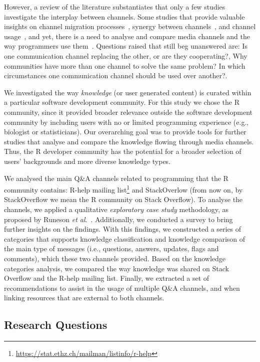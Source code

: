 \documentclass{sig-alternate-05-2015}
\begin{document}
	However, a review of the literature substantiates that only a few studies investigate the interplay between channels.
	Some studies that provide valuable insights on channel migration processes~\cite{Vasilescu2014c}, synergy between channels~\cite{Vasilescu2013a, Bird2006, Kavaler2013}, and channel usage~\cite{Stolee2010,Storey2014}, and yet, there is a need to analyse and compare media channels and the way programmers use them~\cite{Vasilescu2014b}.
	Questions raised that still beg unanswered are: Is one communication channel replacing the other, or are they cooperating?, Why communities have more than one channel to solve the same problem? In which circumstances one communication channel should be used over another?.

	We investigated the way \textit{knowledge} (or user generated content) is curated within a particular software development community.
	For this study we chose the R community, since it provided broader relevance outside the software development community by including users with no or limited programming experience (e.g., biologist or statisticians).
	Our overarching goal was to provide tools for further studies that analyse and compare the knowledge flowing through media channels.
	Thus, the R developer community has the potential for a broader selection of users' backgrounds and more diverse knowledge types. 

    We analysed the main Q\&A channels related to programming that the R community contains: R-help mailing list\footnote{\url{https://stat.ethz.ch/mailman/listinfo/r-help}} and StackOverlow (from now on, by StackOverflow we mean the R community on Stack Overflow).
    To analyse the channels, we applied a qualitative \textit{exploratory case study} methodology, as proposed by Runeson \textit{et al}.~\cite{Runeson2012}.
	Additionally, we conducted a survey to bring further insights on the findings.
	With this findings, we constructed a series of categories that supports knowledge classification and knowledge comparison of the main type of messages (i.e., questions, answers, updates, flags and comments), which these two channels provided.
	Based on the knowledge categories analysis, we compared the way knowledge was shared on Stack Overflow and the R-help mailing list.
	Finally, we extracted a set of recommendations to assist in the usage of multiple Q\&A channels, and when linking resources that are external to both channels.

\subsection{Research Questions}
\end{document}
